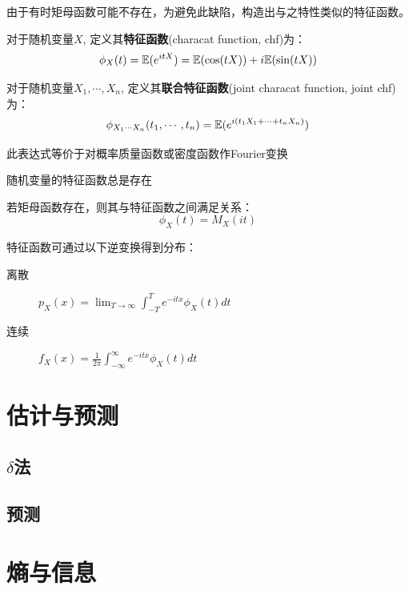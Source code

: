 由于有时矩母函数可能不存在，为避免此缺陷，构造出与之特性类似的特征函数。

\begin{definition}
    对于随机变量$X$, 定义其\textbf{特征函数}(characat function, chf)为：
    \[ \phi_X(t) = \mathbb{E}(e^{itX}) = \mathbb{E}(\cos (tX)) + i\mathbb{E}(\sin (tX))\]

    对于随机变量$X_1,\cdots, X_n$, 定义其\textbf{联合特征函数}(joint characat function, joint chf)为：
    \[ \phi_{X_1\cdots X_n}(t_1,\cdots ,t_n) = \mathbb{E}(e^{i (t_1 X_1+\cdots + t_n X_n)}) \]
\end{definition}

\begin{remark}
    此表达式等价于对概率质量函数或密度函数作Fourier变换
\end{remark}

\begin{proposition}
    随机变量的特征函数总是存在
\end{proposition}

\begin{proposition}
    若矩母函数存在，则其与特征函数之间满足关系：
    \[ \phi_X(t) = M_X(it) \]
\end{proposition}

\begin{theorem}
    特征函数可通过以下逆变换得到分布：
    \begin{description}
        \item[离散] $p_{X}(x)=\lim _{T \rightarrow \infty} \int_{-T}^{T} e^{-i t x} \phi_{X}(t) d t$
        \item[连续] $f_{X}(x)=\frac{1}{2 \pi} \int_{-\infty}^{\infty} e^{-i t x} \phi_{X}(t) d t$
    \end{description}
\end{theorem}

\section{估计与预测}

\subsection{$\delta$法}

\subsection{预测}




\section{熵与信息}
